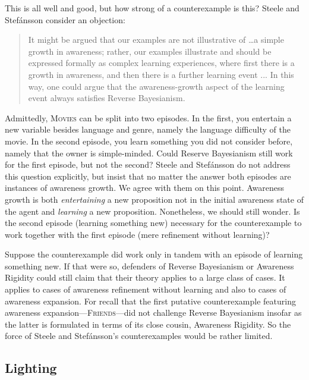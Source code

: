 \documentclass[
  11pt,
  dvipsnames,enabledeprecatedfontcommands]{scrartcl}
\begin{document}
This is all well and good, but how strong of a counterexample is this?
Steele and Stefánsson consider an objection:

\begin{quote}It might be argued that our examples are not illustrative of \dots a simple growth in awareness; rather, our examples illustrate and should be expressed 
  formally as complex learning experiences, where first there is a growth in awareness, and then 
  there is a further learning event ... In this way, one could argue that the awareness-growth 
  aspect of the learning event always satisfies Reverse Bayesianism.
\end{quote}

\noindent  Admittedly, \textsc{Movies} can be split into two episodes.
In the first, you entertain a new variable besides language and genre,
namely the language difficulty of the movie. In the second episode, you
learn something you did not consider before, namely that the owner is
simple-minded. Could Reserve Bayesianism still work for the first
episode, but not the second? Steele and Stefánsson do not address this
question explicitly, but insist that no matter the answer both episodes
are instances of awareness growth. We agree with them on this point.
Awareness growth is both \textit{entertaining} a new proposition not in
the initial awareness state of the agent and \textit{learning} a new
proposition. Nonetheless, we should still wonder. Is the second episode
(learning something new) necessary for the counterexample to work
together with the first episode (mere refinement without learning)?

Suppose the counterexample did work only in tandem with an episode of
learning something new. If that were so, defenders of Reverse
Bayesianism or Awareness Rigidity could still claim that their theory
applies to a large class of cases. It applies to cases of awareness
refinement without learning and also to cases of awareness expansion.
For recall that the first putative counterexample featuring awareness
expansion---\textsc{Friends}---did not challenge Reverse Bayesianism
insofar as the latter is formulated in terms of its close cousin,
Awareness Rigidity. So the force of Steele and Stefánsson's
counterexamples would be rather limited.

\hypertarget{lighting}{%
\subsection{Lighting}\label{lighting}}
\end{document}
